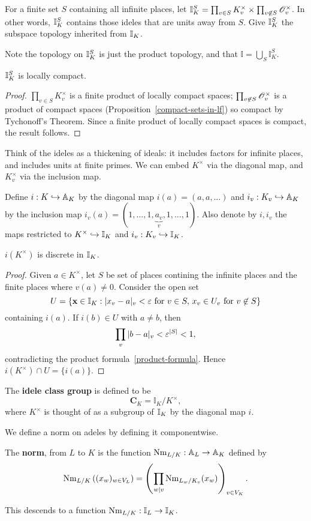 \begin{df}
For a finite set $S$ containing all infinite places, let $\mathbb I_K^S=\prod_{v\in S} K^{\times}_v\times \prod_{v\not\in S} \mathscr{O}_v^{\times}$. In other words, $\mathbb{I}_K^S$ contains those ideles that are units away from $S$.
Give $\mathbb{I}_K^S$ the subspace topology inherited from $\mathbb{I}_K$.
\end{df}
Note the topology on $\mathbb{I}_K^S$ is just the product topology, and that $\mathbb I=\bigcup_{S} \mathbb I_K^S$.
\begin{pr}
$\mathbb{I}_K^S$ is locally compact.
\end{pr}
\begin{proof}
$\prod_{v\in S} K^{\times}_v$ is a finite product of locally compact spaces; $\prod_{v\not\in S} \mathscr{O}_v^{\times}$ is a product of compact spaces (Proposition~\ref{compact-sets-in-lf}) so compact by Tychonoff's Theorem. Since a finite product of locally compact spaces is compact, the result follows.
\end{proof}

Think of the ideles as a thickening of ideals: it includes factors for infinite places, and includes units at finite primes. We can embed $K^{\times}$ via the diagonal map, and $K_v^{\times}$ via the inclusion map.
\begin{df}
Define $i:K\hookrightarrow \mathbb{A}_K$ by the diagonal map $i(a)=(a,a,\ldots)$ and $i_v:K_v\hookrightarrow \mathbb{A}_K$ by the inclusion map $i_v(a)=(1,\ldots, 1,\underbrace{a_v}_v,1,\ldots, 1)$. Also denote by $i,i_v$ the maps restricted to $K^{\times}\hookrightarrow \mathbb{I}_K$ and $i_v:K_v\hookrightarrow \mathbb{I}_K$.
\end{df}
\begin{pr}
$i(K^{\times})$ is discrete in $\mathbb{I}_K$.
\end{pr}
\begin{proof}
Given $a\in K^{\times}$, let $S$ be set of places contining the infinite places and the finite places where $v(a)\ne 0$. 
Consider the open set
\[
U=\left\{{\mathbf x\in \mathbb{I}_K}:{|x_v-a|_v<\varepsilon\text{ for }v\in S, \, x_v\in U_v\text{ for }v\not\in S}\right\}
\]
containing $i(a)$. If $i(b)\in U$ with $a\ne b$, then
\[
\prod_v|b-a|_v<\varepsilon^{|S|}<1,
\]
contradicting the product formula~\ref{product-formula}. Hence $i(K^{\times})\cap U=\{i(a)\}$.
\end{proof}
\begin{df}
The \textbf{idele class group} is defined to be 
\[\mathbf C_K=\mathbb I_K/K^{\times},\]
where $K^{\times}$ is thought of as a subgroup of $\mathbb{I}_K$ by the diagonal map $i$.
\end{df}
We define a norm on adeles by defining it componentwise.
\begin{df}
The \textbf{norm}, from $L$ to $K$ is the function $\operatorname{Nm}_{L/K}:\mathbb A_L\to \mathbb A_K$ defined by
\[
\operatorname{Nm}_{L/K}\left( {(x_w)_{w\in V_L}} \right)=\left( {\prod_{w\mid v} \operatorname{Nm}_{L_w/K_v}(x_w)} \right)_{v\in V_K}.
\]
\end{df}
This descends to a function $\operatorname{Nm}_{L/K}:\mathbb{I}_L\to \mathbb{I}_K$.
